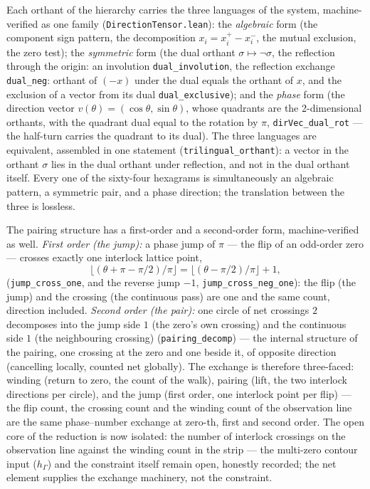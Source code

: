 \documentclass{article}
\begin{document}
Each orthant of the hierarchy carries the three languages of the
system, machine-verified as one family
(\texttt{DirectionTensor.lean}): the \emph{algebraic} form (the
component sign pattern, the decomposition $x_i=x_i^+-x_i^-$, the
mutual exclusion, the zero test); the \emph{symmetric} form (the
dual orthant $\sigma\mapsto\neg\sigma$, the reflection through the
origin: an involution \texttt{dual\_involution}, the reflection
exchange \texttt{dual\_neg}: orthant of $(-x)$ under the dual equals
the orthant of $x$, and the exclusion of a vector from its dual
\texttt{dual\_exclusive}); and the \emph{phase} form (the direction
vector $v(\theta)=(\cos\theta,\sin\theta)$, whose quadrants are the
2-dimensional orthants, with the quadrant dual equal to the rotation
by $\pi$, \texttt{dirVec\_dual\_rot} --- the half-turn carries the
quadrant to its dual). The three languages are equivalent, assembled
in one statement (\texttt{trilingual\_orthant}): a vector in the
orthant $\sigma$ lies in the dual orthant under reflection, and not
in the dual orthant itself. Every one of the sixty-four hexagrams is
simultaneously an algebraic pattern, a symmetric pair, and a phase
direction; the translation between the three is lossless.

The pairing structure has a first-order and a second-order form,
machine-verified as well. \emph{First order (the jump):} a phase jump
of $\pi$ --- the flip of an odd-order zero --- crosses exactly one
interlock lattice point,
\begin{equation}
  \lfloor(\theta+\pi-\pi/2)/\pi\rfloor =
    \lfloor(\theta-\pi/2)/\pi\rfloor + 1,
\end{equation}
(\texttt{jump\_cross\_one}, and the reverse jump $-1$,
\texttt{jump\_cross\_neg\_one}): the flip (the jump) and the crossing
(the continuous pass) are one and the same count, direction included.
\emph{Second order (the pair):} one circle of net crossings $2$
decomposes into the jump side $1$ (the zero's own crossing) and the
continuous side $1$ (the neighbouring crossing)
(\texttt{pairing\_decomp}) --- the internal structure of the pairing,
one crossing at the zero and one beside it, of opposite direction
(cancelling locally, counted net globally). The exchange is therefore
three-faced: winding (return to zero, the count of the walk), pairing
(lift, the two interlock directions per circle), and the jump (first
order, one interlock point per flip) --- the flip count, the crossing
count and the winding count of the observation line are the same
phase--number exchange at zero-th, first and second order. The open core of the reduction is now
isolated: the number of interlock crossings on the observation line
against the winding count in the strip --- the multi-zero contour
input ($h_\Gamma$) and the constraint itself remain open, honestly
recorded; the net element supplies the exchange machinery, not the
constraint.
\end{document}
